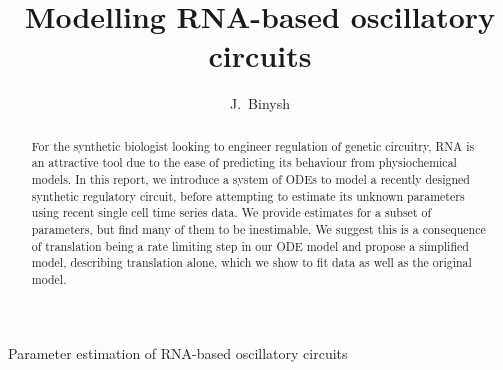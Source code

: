 \documentclass[10pt,journal]{./IEEE_latex_class/IEEEtran}
\begin{document}
%
\title{Modelling RNA-based oscillatory circuits}

\author{J.~Binysh
        \\ }

%
{Parameter estimation of RNA-based oscillatory circuits}

\maketitle

\thispagestyle{empty}

\newcommand{\MYheader}{\smash{\scriptsize

\hfil\parbox[t][\height][t]{\textwidth}{\centering {\normalsize
Place conference title here}}\hfil\hbox{}}}
\makeatletter

\if@twoside
  \def\ps@headings{%
      \let\@oddfoot\@empty\let\@evenfoot\@empty
      \def\@evenhead{\small\thepage\hfil\leftmark\strut\vadjust{\vskip .1ex\hrule}}%
      \def\@oddhead{\small\rightmark\hfil\thepage\strut\vadjust{\vskip .1ex\hrule}}%
      \let\@mkboth\markboth
    \def\chaptermark##1{%
      \markboth{\scshape%
        \ifnum \c@secnumdepth >\m@ne
            \@chapapp\ \thechapter. \ %
        \fi
        ##1}{}}%
    \def\sectionmark##1{%
      \markright{\scshape%
        \ifnum \c@secnumdepth >\z@
          \thesection. \ %
        \fi
        ##1}}}
\else
  \def\ps@headings{%
    \let\@oddfoot\@empty
    \def\@oddhead{{\slshape\rightmark}\hfil\thepage\ of\ \pageref{LastPage} \strut\vadjust{\vskip .1ex\hrule}}%
    \let\@mkboth\markboth
    \def\chaptermark##1{%
      \markright{\scshape%
        \ifnum \c@secnumdepth >\m@ne
            \@chapapp\ \thechapter. \ %
        \fi
        ##1}}}
\fi
\makeatother

\makeatother

\pagestyle{headings}

\begin{abstract}
For the synthetic biologist looking to engineer regulation of genetic circuitry, RNA is an attractive tool due to the ease of predicting its behaviour from physiochemical models. In this report, we introduce a system of ODEs to model a recently designed synthetic regulatory circuit, before attempting to estimate its unknown parameters using recent single cell time series data. We provide estimates for a subset of parameters, but find many of them to be inestimable. We suggest this is a consequence of translation being a rate limiting step in our ODE model and propose a simplified model, describing translation alone, which we show to fit data as well as the original model.
\end{abstract}
\end{document}
